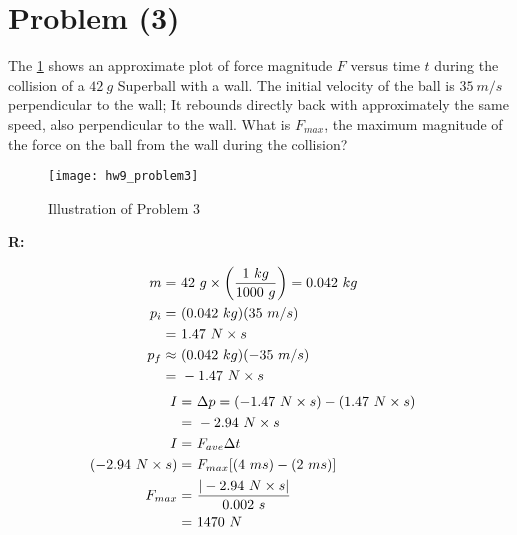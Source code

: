 \section{Problem (3)}

	The \cref{fig:hw9_problem3} shows an approximate plot of force magnitude $F$ versus time $t$ during the collision of a $42 \ g$ Superball with a wall. The initial velocity of the ball is $35 \ m/s$ perpendicular to the wall; It rebounds directly back with approximately the same speed, also perpendicular to the wall. What is $F_{max}$, the maximum magnitude of the force on the ball from the wall during the collision?

	\begin{figure}[H]
		\begin{center}
			\texttt{[image: hw9\_problem3]}
			\caption{Illustration of Problem 3}
			\label{fig:hw9_problem3}
		\end{center}
	\end{figure}

	\textbf{R:}

	\begin{align}
		m = \ &42 \ g \times \left(\frac{1 \ kg}{1000 \ g}\right) = 0.042 \ kg& \notag \\
		p_{i} = \ &(0.042 \ kg)(35 \ m/s)& \notag \\
		= \ &1.47 \ N \times s& \notag \\
		p_{f} \approx \ &(0.042 \ kg)(-35 \ m/s)& \notag \\
		= \ &-1.47 \ N \times s& \notag
	\end{align}
	\begin{align}
		I = \ &\Delta p = (-1.47 \ N \times s) - (1.47 \ N \times s)& \notag \\
		= \ &- 2.94 \ N \times s& \notag \\
		I = \ &F_{ave} \Delta t& \notag \\
		(-2.94 \ N \times s) = \ &F_{max} [(4 \ ms) - (2 \ ms)]& \notag \\
		F_{max} = \ &\frac{|- 2.94 \ N \times s|}{0.002 \ s}& \notag \\
		= \ &1470 \ N&
	\end{align}
